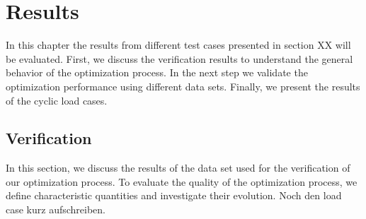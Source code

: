     
    
    \chapter{Results}

    In this chapter the results from different test cases presented in section XX will be evaluated. First, we discuss the verification results to understand the general behavior of the optimization process. In the next step we validate the optimization performance using different data sets. 
    Finally, we present the results of the cyclic load cases.

    
    \section{Verification}\label{verification}

    In this section, we discuss the results of the data set used for the verification of our optimization process. To evaluate the quality of the optimization process, we define characteristic quantities and investigate their evolution. 
    Noch den load case kurz aufschreiben.


